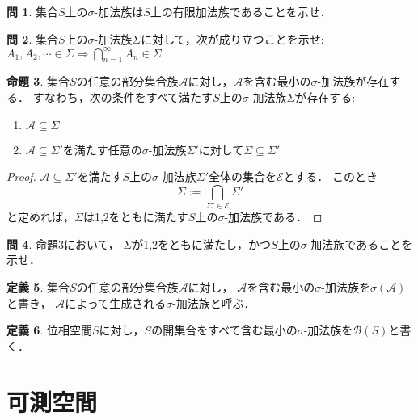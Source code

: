 \documentclass{jsreport}
\theoremstyle{definition}
\newtheorem{defi}{定義}[section]
\newtheorem{prop}[defi]{命題}
\newtheorem{qst}[defi]{問}
\begin{document}
\begin{qst}\label{qst_sigma_algebra_is_algebra}
集合$S$上の$\sigma$-加法族は$S$上の有限加法族であることを示せ．
\end{qst}

\begin{qst}\label{qst_countable_intersection}
集合$S$上の$\sigma$-加法族$\Sigma$に対して，次が成り立つことを示せ:
$A_1,A_2,\cdots\in\Sigma \Rightarrow \displaystyle \bigcap_{n=1}^\infty A_n\in\Sigma$
\end{qst}

\begin{prop}\label{prop_generated_sigma_algebra}
集合$S$の任意の部分集合族$\mathcal{A}$に対し，$\mathcal{A}$を含む最小の$\sigma$-加法族が存在する．
すなわち，次の条件をすべて満たす$S$上の$\sigma$-加法族$\Sigma$が存在する:
\begin{enumerate}
\item$\mathcal{A}\subseteq\Sigma$
\item$\mathcal{A}\subseteq\Sigma'$を満たす任意の$\sigma$-加法族$\Sigma'$に対して$\Sigma\subseteq\Sigma'$
\end{enumerate}
\end{prop}

\begin{proof}
$\mathcal{A}\subseteq\Sigma'$を満たす$S$上の$\sigma$-加法族$\Sigma'$全体の集合を$\mathcal{E}$とする．
このとき
\[ \Sigma:=\bigcap_{\Sigma'\in\mathcal{E}}\Sigma' \]
と定めれば，$\Sigma$は1,2をともに満たす$S$上の$\sigma$-加法族である．
\end{proof}

\begin{qst}\label{qst_proof_of_generated_sigma_algebra}
命題\ref{prop_generated_sigma_algebra}において，
$\Sigma$が1,2をともに満たし，かつ$S$上の$\sigma$-加法族であることを示せ．
\end{qst}

\begin{defi}\label{def_generated_sigma_algebra}
集合$S$の任意の部分集合族$\mathcal{A}$に対し，
$\mathcal{A}$を含む最小の$\sigma$-加法族を$\sigma(\mathcal{A})$と書き，
$\mathcal{A}$によって生成される$\sigma$-加法族と呼ぶ．
\end{defi}

\begin{defi}\label{def_Borel_set}
位相空間$S$に対し，$S$の開集合をすべて含む最小の$\sigma$-加法族を$\mathcal{B}(S)$と書く．
\end{defi}

\section{可測空間}
\end{document}
